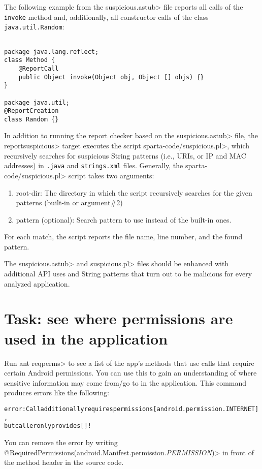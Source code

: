 The following example from the \<suspicious.astub> file reports all calls
of the \verb|invoke| method and, additionally, all constructor calls 
of the class \verb|java.util.Random|:

\begin{Verbatim}

package java.lang.reflect;                                             
class Method {                                                         
    @ReportCall                                                        
    public Object invoke(Object obj, Object [] objs) {}                
}                                                                      
                                                                       
package java.util;                                                     
@ReportCreation                                                        
class Random {}

\end{Verbatim}

In addition to running the report checker based on the 
\<suspicious.astub> file, the \<reportsuspicious> target executes
the script \<sparta-code/suspicious.pl>, which recursively searches for 
suspicious String patterns (i.e., URIs, or IP and MAC addresses) 
in \verb|.java| and \verb|strings.xml| files.
Generally, the \<sparta-code/suspicious.pl> script takes two arguments:
\begin{enumerate}
 \item root-dir: The directory in which the script recursively 
       searches for the given patterns (built-in or argument\#2)
 \item pattern (optional): Search pattern to use instead of the
built-in ones. 
\end{enumerate}
For each match, the script reports the file name, line
number, and the found pattern.

The \<suspicious.astub> and \<suspicious.pl> files should be enhanced
with additional API uses and String patterns that turn out to be 
malicious for every analyzed application. 


\section{Task: see where permissions are used in the application}
\label{sec:appanalysis/reqperms}

Run \<ant reqperms>  to see a list of the app's methods
that use calls that require certain Android permissions. You can use
this to gain an understanding of where sensitive information may come
from/go to in the application. This command produces errors like the following:
\begin{alltt}
error: Call additionally requires permissions [android.permission.INTERNET], 
   but caller only provides []!
\end{alltt}
You can remove the error by writing
\<@RequiredPermissions({android.Manifest.permission.\emph{PERMISSION}})> in front of the method header in the source code.


